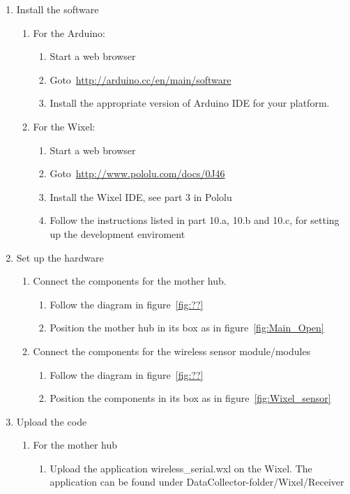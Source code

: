 \begin{enumerate}
\item Install the software
	\begin{enumerate}
	\item For the Arduino:
		\begin{enumerate}
		\item Start a web browser
		\item Goto~\url{http://arduino.cc/en/main/software}
		\item Install the appropriate version of Arduino IDE for your platform.
		\end{enumerate}
	\item For the Wixel:
		\begin{enumerate}
		\item Start a web browser
		\item Goto~\url{http://www.pololu.com/docs/0J46}
		\item Install the Wixel IDE, see part 3 in Pololu
		\item Follow the instructions listed in part 10.a, 10.b and 10.c, for setting up the development enviroment
		\end{enumerate}
	\end{enumerate}
\item Set up the hardware
	\begin{enumerate}
	\item Connect the components for the mother hub.
		\begin{enumerate}
		\item Follow the diagram in figure~\ref{fig:??}
		\item Position the mother hub in its box as in figure~\ref{fig:Main_Open}
		\end{enumerate}
	\item Connect the components for the wireless sensor module/modules
		\begin{enumerate}
		\item Follow the diagram in figure~\ref{fig:??}
		\item Position the components in its box as in figure~\ref{fig:Wixel_sensor}
		\end{enumerate}
	\end{enumerate}
\item Upload the code
	\begin{enumerate}
	\item For the mother hub
		\begin{enumerate}
		\item Upload the application wireless\_serial.wxl on the Wixel. The application can be found under DataCollector-folder/Wixel/Receiver

\end{enumerate}
\end{enumerate}
\end{enumerate}
